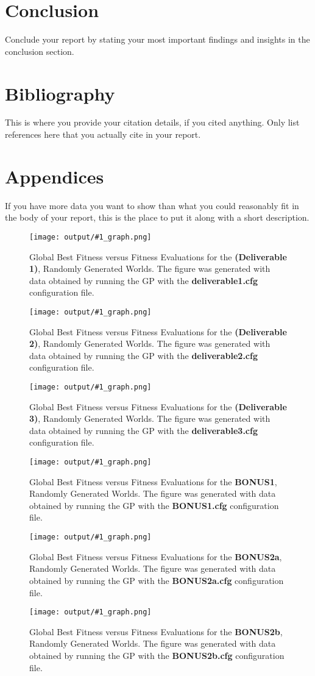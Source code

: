 \documentclass[11pt]{article}
\newcommand{\fitnessplotcaption}[2]{\caption{Global Best Fitness versus Fitness Evaluations for the \textbf{{#1}}, Randomly Generated Worlds. The figure was generated with data obtained by running the GP with the \textbf{{#2}} configuration file.}}
\newcommand{\addgraphic}[1]{\centerline{\texttt{[image: output/\#1\_graph.png]}}}
\begin{document}
\section{Conclusion}
Conclude your report by stating your most important findings and insights in the conclusion
section.

\section{Bibliography}
This is where you provide your citation details, if you cited anything. Only list references
here that you actually cite in your report.

\section{Appendices}
If you have more data you want to show than what you could reasonably fit in the body
of your report, this is the place to put it along with a short description.

\begin{figure}[H]
    \addgraphic{deliverable1}
    \fitnessplotcaption{(Deliverable 1)}{deliverable1.cfg}
    \label{fig:deliverable1}
\end{figure}

\begin{figure}[H]
    \addgraphic{deliverable2}
    \fitnessplotcaption{(Deliverable 2)}{deliverable2.cfg}
    \label{fig:deliverable2}
\end{figure}

\begin{figure}[H]
    \addgraphic{deliverable3}
    \fitnessplotcaption{(Deliverable 3)}{deliverable3.cfg}
    \label{fig:deliverable3}
\end{figure}

\begin{figure}[H]
    \addgraphic{BONUS1}
    \fitnessplotcaption{BONUS1}{BONUS1.cfg}
    \label{fig:BONUS1}
\end{figure}

\begin{figure}[H]
    \addgraphic{BONUS2a}
    \fitnessplotcaption{BONUS2a}{BONUS2a.cfg}
    \label{fig:BONUS2a}
\end{figure}

\begin{figure}[H]
    \addgraphic{BONUS2b}
    \fitnessplotcaption{BONUS2b}{BONUS2b.cfg}
    \label{fig:BONUS2b}
\end{figure}
\end{document}
